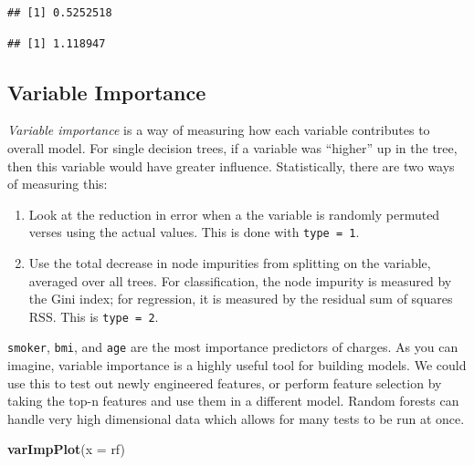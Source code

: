 \documentclass[openany]{book}
\newenvironment{Shaded}{\begin{snugshade}}{\end{snugshade}}
\newcommand{\DataTypeTok}[1]{\textcolor[rgb]{0.13,0.29,0.53}{#1}}
\newcommand{\KeywordTok}[1]{\textcolor[rgb]{0.13,0.29,0.53}{\textbf{#1}}}
\newcommand{\NormalTok}[1]{#1}
\newcommand{\OperatorTok}[1]{\textcolor[rgb]{0.81,0.36,0.00}{\textbf{#1}}}
\begin{document}
\begin{verbatim}
## [1] 0.5252518
\end{verbatim}

\begin{Shaded}
\end{Shaded}

\begin{verbatim}
## [1] 1.118947
\end{verbatim}

\hypertarget{variable-importance}{%
\subsection{Variable Importance}\label{variable-importance}}

\emph{Variable importance} is a way of measuring how each variable contributes to overall model. For single decision trees, if a variable was ``higher'' up in the tree, then this variable would have greater influence. Statistically, there are two ways of measuring this:

\begin{enumerate}
\def\labelenumi{\arabic{enumi})}
\item
  Look at the reduction in error when a the variable is randomly permuted verses using the actual values. This is done with \texttt{type\ =\ 1}.
\item
  Use the total decrease in node impurities from splitting on the variable, averaged over all trees. For classification, the node impurity is measured by the Gini index; for regression, it is measured by the residual sum of squares \(\text{RSS}\). This is \texttt{type\ =\ 2}.
\end{enumerate}

\texttt{smoker}, \texttt{bmi}, and \texttt{age} are the most importance predictors of charges. As you can imagine, variable importance is a highly useful tool for building models. We could use this to test out newly engineered features, or perform feature selection by taking the top-n features and use them in a different model. Random forests can handle very high dimensional data which allows for many tests to be run at once.

\begin{Shaded}
\begin{Highlighting}[]
\KeywordTok{varImpPlot}\NormalTok{(}\DataTypeTok{x =}\NormalTok{ rf)}
\end{Highlighting}
\end{Shaded}
\end{document}
